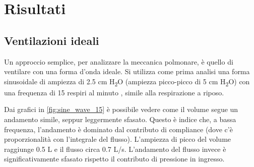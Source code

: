 \section{Risultati}

\subsection{Ventilazioni ideali}

Un approccio semplice, per analizzare la meccanica polmonare, è quello di ventilare con una forma d'onda ideale. Si utilizza come prima analisi una forma sinusoidale di ampiezza di 2.5 cm H\textsubscript{2}O (ampiezza picco-picco di 5 cm H\textsubscript{2}O) con una frequenza di 15 respiri al minuto \cite{khoo_physiological_2018}, simile alla respirazione a riposo.

Dai grafici in \cref{fig:sine_wave_15} è possibile vedere come il volume segue un andamento simile, seppur leggermente sfasato. Questo è indice che, a bassa frequenza, l'andamento è dominato dal contributo di compliance (dove c'è proporzionalità con l'integrale del flusso). L'ampiezza di picco del volume raggiunge 0.5 L e il flusso circa 0.7 L/s. L'andamento del flusso invece è significativamente sfasato rispetto il contributo di pressione in ingresso. 

